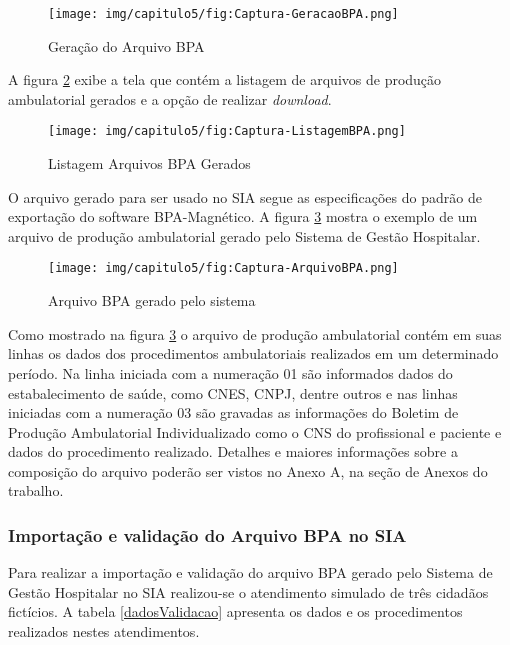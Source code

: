 \begin{figure}[H]
    \centering
     \caption{Geração do Arquivo BPA}
    \texttt{[image: img/capitulo5/fig:Captura-GeracaoBPA.png]}
    \label{fig:Captura-GeracaoBPA}
\end{figure}

A figura \ref{fig:Captura-ListagemBPA} exibe a tela que contém a listagem de arquivos de produção ambulatorial gerados e a opção de realizar \textit{download}.

\begin{figure}[H]
    \centering
     \caption{Listagem Arquivos BPA Gerados}
    \texttt{[image: img/capitulo5/fig:Captura-ListagemBPA.png]}
    \label{fig:Captura-ListagemBPA}
\end{figure}

O arquivo gerado para ser usado no SIA segue as especificações do padrão de exportação do software BPA-Magnético. A figura \ref{fig:Captura-ArquivoBPA} mostra o exemplo de um arquivo de produção ambulatorial gerado pelo Sistema de Gestão Hospitalar.

\begin{figure}[H]
    \centering
     \caption{Arquivo BPA gerado pelo sistema}
    \texttt{[image: img/capitulo5/fig:Captura-ArquivoBPA.png]}
    \label{fig:Captura-ArquivoBPA}
\end{figure}

Como mostrado na figura \ref{fig:Captura-ArquivoBPA} o arquivo de produção ambulatorial contém em suas linhas os dados dos procedimentos ambulatoriais realizados em um determinado período. Na linha iniciada com a numeração 01 são informados dados do estabalecimento de saúde, como CNES, CNPJ, dentre outros e nas linhas iniciadas com a numeração 03 são gravadas as informações do Boletim de Produção Ambulatorial Individualizado como o CNS do profissional e paciente e dados do procedimento realizado. Detalhes e maiores informações sobre a composição do arquivo poderão ser vistos no Anexo A, na seção de Anexos do trabalho.

\subsubsection{Importação e validação do Arquivo BPA no SIA}
Para realizar a importação e validação do arquivo BPA gerado pelo Sistema de Gestão Hospitalar no SIA realizou-se o atendimento simulado de três cidadãos fictícios. A tabela \ref{dadosValidacao} apresenta os dados e os procedimentos realizados nestes atendimentos.

